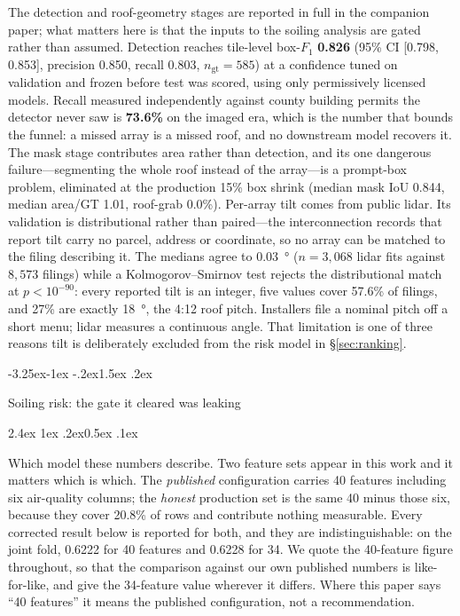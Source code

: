 \documentclass[10pt,twocolumn]{article}
\makeatletter
\renewcommand\subsection{\@startsection{subsection}{2}{\z@}%
  {-3.25ex\@plus -1ex \@minus -.2ex}{1.5ex \@plus .2ex}%
  {\normalfont\large\bfseries\raggedright}}
\renewcommand\paragraph{\@startsection{paragraph}{4}{\z@}%
  {2.4ex \@plus1ex \@minus.2ex}{0.5ex \@plus .1ex}%
  {\normalfont\normalsize\bfseries\raggedright}}
\makeatother
\begin{document}
The detection and roof-geometry stages are reported in full in the companion
paper; what matters here is that the inputs to the soiling analysis are gated
rather than assumed. Detection reaches tile-level box-$F_1$ \textbf{0.826}
(95\% CI [0.798, 0.853], precision 0.850, recall 0.803, $n_{\text{gt}}=585$) at a
confidence tuned on validation and frozen before test was scored, using only
permissively licensed models. Recall measured independently against county
building permits the detector never saw is \textbf{73.6\%} on the imaged era,
which is the number that bounds the funnel: a missed array is a missed roof, and
no downstream model recovers it. The mask stage contributes area rather than
detection, and its one dangerous failure---segmenting the whole roof instead of
the array---is a prompt-box problem, eliminated at the production 15\% box shrink
(median mask IoU 0.844, median area/GT 1.01, roof-grab 0.0\%). Per-array tilt comes
from public lidar. Its validation is distributional rather than paired---the
interconnection records that report tilt carry no parcel, address or coordinate,
so no array can be matched to the filing describing it. The medians agree to
\SI{0.03}{\degree} ($n=3{,}068$ lidar fits against $8{,}573$ filings) while a
Kolmogorov--Smirnov test rejects the distributional match at $p<10^{-90}$: every
reported tilt is an integer, five values cover 57.6\% of filings, and 27\% are
exactly \SI{18}{\degree}, the 4:12 roof pitch. Installers file a nominal pitch off
a short menu; lidar measures a continuous angle.
That limitation is one of three reasons tilt is deliberately excluded from the
risk model in \S\ref{sec:ranking}.

\subsection{Soiling risk: the gate it cleared was leaking}
\label{sec:results-risk}

\paragraph{Which model these numbers describe.}
Two feature sets appear in this work and it matters which is which. The \emph{published}
configuration carries 40 features including six air-quality columns; the \emph{honest}
production set is the same 40 minus those six, because they cover 20.8\% of rows and
contribute nothing measurable. Every corrected result below is reported for both, and they
are indistinguishable: on the joint fold, 0.6222 for 40 features and 0.6228 for 34. We
quote the 40-feature figure throughout, so that the comparison against our own published
numbers is like-for-like, and give the 34-feature value wherever it differs. Where this
paper says ``40 features'' it means the published configuration, not a recommendation.
\end{document}
